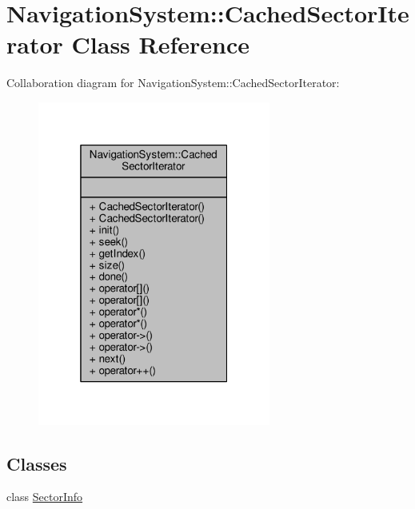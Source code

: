 \hypertarget{classNavigationSystem_1_1CachedSectorIterator}{}\section{Navigation\+System\+:\+:Cached\+Sector\+Iterator Class Reference}
\label{classNavigationSystem_1_1CachedSectorIterator}


Collaboration diagram for Navigation\+System\+:\+:Cached\+Sector\+Iterator\+:
\nopagebreak
\begin{figure}[H]
\begin{center}
\leavevmode
\includegraphics[width=217pt]{d9/d16/classNavigationSystem_1_1CachedSectorIterator__coll__graph}
\end{center}
\end{figure}
\subsection*{Classes}
\begin{DoxyCompactItemize}
\item 
class \hyperlink{classNavigationSystem_1_1CachedSectorIterator_1_1SectorInfo}{Sector\+Info}
\end{DoxyCompactItemize}
